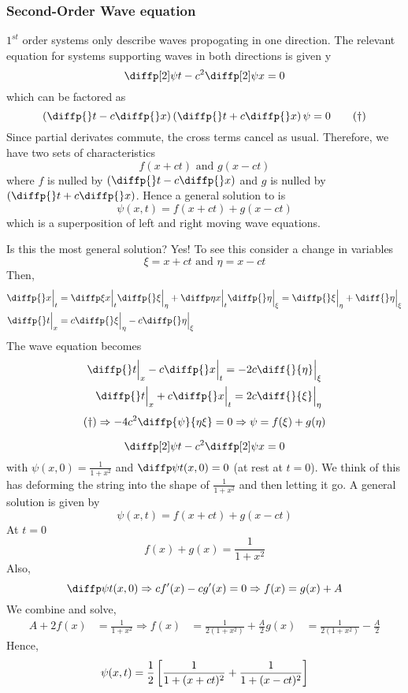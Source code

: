 \documentclass{article}
\begin{document}
\subsubsection{Second-Order Wave equation}
$1^{st}$ order systems only describe waves propogating in one direction.
The relevant equation for systems supporting waves in both directions is given y
\[
    \diffp[2] \psi t - c^2 \diffp[2] \psi x = 0
\]
which can be factored as
\[
    \bkt{\diffp {}t- c \diffp {}x}\bkt{\diffp {}t + c \diffp {}x}\psi = 0 \tagdagger
\]
Since partial derivates commute, the cross terms cancel as usual.
Therefore, we have two sets of characteristics
\[
    f(x + ct) \text{ and } g(x - ct)
\]
where $f$ is nulled by $\bkt{\diffp {}t- c \diffp {}x}$ and $g$ is nulled by $\bkt{\diffp {}t + c \diffp {}x}$.
Hence a general solution to  is
\[
    \psi(x, t) = f(x + ct) + g(x - ct)
\]
which is a superposition of left and right moving wave equations.

Is this the most general solution? Yes! To see this consider a change in variables
\[
    \xi = x + ct \text{ and } \eta = x - ct    
\]
Then,
\begin{align*}
    \diffp {}x \eval_{t} &= \diffp \xi x \eval_{t} \diffp {}\xi \eval_{\eta} + \diffp \eta x \eval_{t} \diffp {}\eta \eval_{\xi} = \diffp {}\xi \eval_{\eta} + \diff{}\eta \eval_{\xi} \\
    \diffp {}t \eval_{x} &= c \diffp {}\xi \eval_{\eta} - c \diffp {}\eta \eval_{\xi} 
\end{align*}
The wave equation becomes
\begin{align*}
    \diffp {}t \eval_{x} - c\diffp {}x \eval_{t} = -2 c \diff{}{\eta} \eval_{\xi} \\
    \diffp {}t \eval_{x} + c\diffp {}x \eval_{t} = 2 c \diff{}{\xi} \eval_{\eta} \\
\end{align*}
\[
    \text{\refdagger} \Rightarrow -4c^2 \diffp{\psi}{{\eta}{\xi}} = 0 \Rightarrow \psi = f(\xi) + g(\eta)
\]
\begin{eg}
    \[
        \diffp[2] \psi t - c^2 \diffp[2] \psi x = 0
    \]
    with $\psi(x, 0) = \frac{1}{1 + x^2}$ and $\diffp \psi t (x, 0) = 0$ (at rest at $t = 0$).
    We think of this has deforming the string into the shape of $\frac{1}{1 + x^2}$ and then letting it go.
    A general solution is given by
    \[
        \psi(x, t) = f(x + ct) + g(x - ct)  
    \]
    At $t = 0$
    \[
        f(x) + g(x) = \frac{1}{1 + x^2}  
    \]
    Also,
    \[
        \diffp \psi t (x, 0) \Rightarrow cf'(x) - cg'(x) = 0 \Rightarrow f(x) = g(x) + A
    \]
    We combine and solve,
    \begin{align*}
        A + 2 f(x) &= \frac{1}{1 + x^2}
        \Rightarrow f(x) &= \frac{1}{2(1 + x^2)} + \frac{A}{2}
        g(x) &=  \frac{1}{2(1 + x^2)} - \frac{A}{2}
    \end{align*}
    Hence, 
    \[
        \psi(x, t) = \frac{1}{2} \left[ \frac{1}{1 + (x + ct)^2} + \frac{1}{1 + (x - ct)^2} \right]
    \]
\end{eg}
\end{document}
